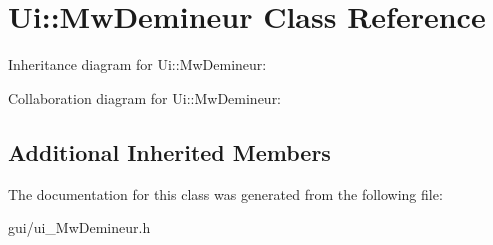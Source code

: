 \hypertarget{class_ui_1_1_mw_demineur}{}\section{Ui\+:\+:Mw\+Demineur Class Reference}
\label{class_ui_1_1_mw_demineur}


Inheritance diagram for Ui\+:\+:Mw\+Demineur\+:


Collaboration diagram for Ui\+:\+:Mw\+Demineur\+:
\subsection*{Additional Inherited Members}


The documentation for this class was generated from the following file\+:\begin{DoxyCompactItemize}
\item 
gui/ui\+\_\+\+Mw\+Demineur.\+h\end{DoxyCompactItemize}
